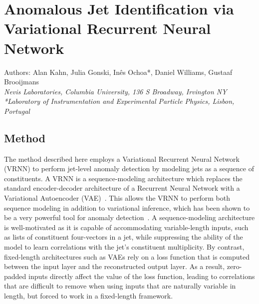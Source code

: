 \documentclass[letterpaper,11pt]{article}
\begin{document}
\section*{Anomalous Jet Identification via Variational Recurrent Neural Network}
Authors: Alan Kahn, Julia Gonski, In\^{e}s Ochoa*, Daniel Williams, Gustaaf Brooijmans \\ \textit{Nevis Laboratories, Columbia University, 136 S Broadway, Irvington NY}\\
\textit{*Laboratory of Instrumentation and Experimental Particle Physics, Lisbon, Portugal}\\



\subsection{Method}
\label{sec:method}


\hspace{\parindent}The method described here employs a Variational Recurrent Neural Network (VRNN) to perform jet-level anomaly detection by modeling jets as a sequence of constituents. A VRNN is a sequence-modeling architecture which replaces the standard encoder-decoder architecture of a Recurrent Neural Network with a Variational Autoencoder (VAE)~\cite{chung2016recurrent}. 
This allows the VRNN to perform both sequence modeling in addition to variational inference, which has been shown to be a very powerful tool for anomaly detection~\cite{An2015VariationalAB}.
A sequence-modeling architecture is well-motivated as it is capable of accommodating variable-length inputs, such as lists of constituent four-vectors in a jet, while suppressing the ability of the model to learn correlations with the jet's constituent multiplicity.
By contrast, fixed-length architectures such as VAEs rely on a loss function that is computed between the input layer and the reconstructed output layer. As a result, zero-padded inputs directly affect the value of the loss function, leading to correlations that are difficult to remove when using inputs that are naturally variable in length, but forced to work in a fixed-length framework. 
\end{document}
